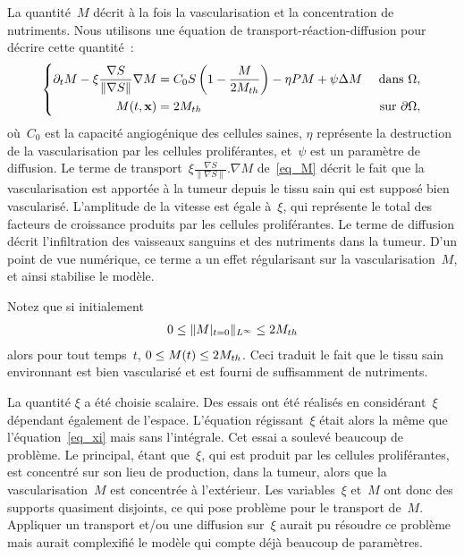 \documentclass[main.tex]{subfiles}
\begin{document}
La quantité~$M$ décrit à la fois la vascularisation et la concentration de nutriments. Nous utilisons une équation de transport-réaction-diffusion pour décrire cette quantité~:
\begin{equation}\label{eq_M}
\left\{
\begin{aligned}
\partial_t M - \xi \frac{\nabla S}{\| \nabla S \|}\nabla M &= C_0 S
\left(1-\frac{M}{2M_{th}}\right) - \eta PM +\psi \Delta M & \textrm{ dans } \Omega, \\
M(t,\mathbf{x})&= 2M_{th} & \textrm{ sur } \partial \Omega,
\end{aligned}
\right.
\end{equation}
où~$C_0$ est la capacité angiogénique des cellules saines, 
$\eta$ représente la destruction de la vascularisation par les cellules proliférantes, et~$\psi$ est un paramètre de diffusion.  
Le terme de transport~$\xi \frac{\nabla S}{\| \nabla S \|}. \nabla M$ de~\eqref{eq_M} décrit le fait que la vascularisation est apportée à la tumeur depuis le tissu sain qui est supposé bien vascularisé.  
L'amplitude de la vitesse est égale à~$\xi$, qui représente le total des facteurs de croissance produits par les cellules proliférantes. 
Le terme de diffusion décrit l'infiltration des vaisseaux sanguins et des nutriments dans la tumeur. D'un point de vue numérique, ce terme a un effet régularisant sur la vascularisation~$M$, et ainsi stabilise le modèle. 


Notez que si initialement 
\begin{align}\label{eq:borneM}
0\leq \|M|_{t=0}\|_{L^\infty}\leq 2M_{th}
\end{align}
alors pour tout temps~$t$, $0\leq M(t) \leq 2M_{th}$. Ceci traduit le fait que le tissu sain environnant est bien vascularisé et est fourni de suffisamment de nutriments.


La quantité $\xi$ a été choisie scalaire. Des essais ont été réalisés en considérant~$\xi$ dépendant également de l'espace. L'équation régissant~$\xi$ était alors la même que l'équation~\eqref{eq_xi} mais sans l'intégrale. Cet essai a soulevé beaucoup de problème. Le principal, étant que~$\xi$, qui est produit par les cellules proliférantes, est concentré sur son lieu de production, \ie dans la tumeur, alors que la vascularisation~$M$ est concentrée à l'extérieur. Les variables~$\xi$ et~$M$ ont donc des supports quasiment disjoints, ce qui pose problème pour le transport de~$M$. Appliquer un transport et/ou une diffusion sur~$\xi$ aurait pu résoudre ce problème mais aurait complexifié le modèle qui compte déjà beaucoup de paramètres.
\end{document}
